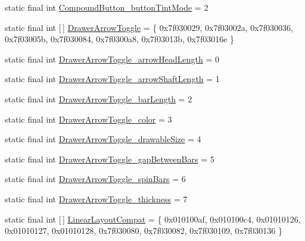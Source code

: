 \begin{DoxyCompactItemize}
\item 
static final int \mbox{\hyperlink{classcom_1_1google_1_1android_1_1gms_1_1R_1_1styleable_a291d0d81e52855826b13587f263a5bcc}{Compound\+Button\+\_\+button\+Tint\+Mode}} = 2
\item 
static final int \mbox{[}$\,$\mbox{]} \mbox{\hyperlink{classcom_1_1google_1_1android_1_1gms_1_1R_1_1styleable_a97918b72a045a3700fb3e3f3d6e96731}{Drawer\+Arrow\+Toggle}} = \{ 0x7f030029, 0x7f03002a, 0x7f030036, 0x7f03005b, 0x7f030084, 0x7f0300a8, 0x7f03013b, 0x7f03016e \}
\item 
static final int \mbox{\hyperlink{classcom_1_1google_1_1android_1_1gms_1_1R_1_1styleable_ac300b2267287bc8c15d6db1b8f8caf68}{Drawer\+Arrow\+Toggle\+\_\+arrow\+Head\+Length}} = 0
\item 
static final int \mbox{\hyperlink{classcom_1_1google_1_1android_1_1gms_1_1R_1_1styleable_aa1ad3be895d0f4a8d1863df9f6ea21b9}{Drawer\+Arrow\+Toggle\+\_\+arrow\+Shaft\+Length}} = 1
\item 
static final int \mbox{\hyperlink{classcom_1_1google_1_1android_1_1gms_1_1R_1_1styleable_aa14edc88cec0712974d65df761660df4}{Drawer\+Arrow\+Toggle\+\_\+bar\+Length}} = 2
\item 
static final int \mbox{\hyperlink{classcom_1_1google_1_1android_1_1gms_1_1R_1_1styleable_a25df9fd2380debae69e2efe9f07b714f}{Drawer\+Arrow\+Toggle\+\_\+color}} = 3
\item 
static final int \mbox{\hyperlink{classcom_1_1google_1_1android_1_1gms_1_1R_1_1styleable_a381f11825dd5d33b999215ee92cbac3a}{Drawer\+Arrow\+Toggle\+\_\+drawable\+Size}} = 4
\item 
static final int \mbox{\hyperlink{classcom_1_1google_1_1android_1_1gms_1_1R_1_1styleable_a39be78bb9a0b0f49ed9b355adfe435d5}{Drawer\+Arrow\+Toggle\+\_\+gap\+Between\+Bars}} = 5
\item 
static final int \mbox{\hyperlink{classcom_1_1google_1_1android_1_1gms_1_1R_1_1styleable_a112af1909b99e5a277e8f682befb4630}{Drawer\+Arrow\+Toggle\+\_\+spin\+Bars}} = 6
\item 
static final int \mbox{\hyperlink{classcom_1_1google_1_1android_1_1gms_1_1R_1_1styleable_ad48521b17c75883a5e1b63ac358ec567}{Drawer\+Arrow\+Toggle\+\_\+thickness}} = 7
\item 
static final int \mbox{[}$\,$\mbox{]} \mbox{\hyperlink{classcom_1_1google_1_1android_1_1gms_1_1R_1_1styleable_ad3598982df80929bb04ae4b1fe5b67d8}{Linear\+Layout\+Compat}} = \{ 0x010100af, 0x010100c4, 0x01010126, 0x01010127, 0x01010128, 0x7f030080, 0x7f030082, 0x7f030109, 0x7f030136 \}

\end{DoxyCompactItemize}
